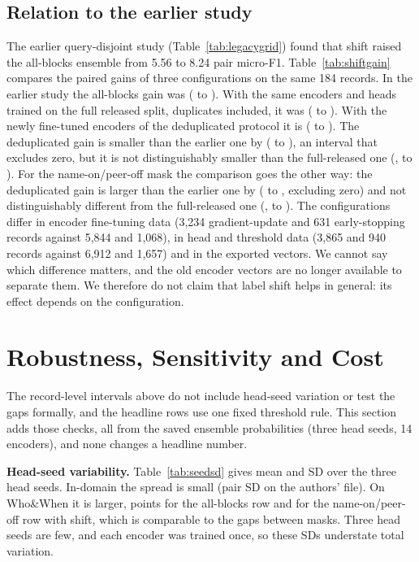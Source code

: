 \documentclass[conference]{IEEEtran}
\begin{document}
\subsection{Relation to the earlier study}
The earlier query-disjoint study (Table~\ref{tab:legacygrid}) found that shift raised the all-blocks ensemble from 5.56 to 8.24 pair micro-F1. Table~\ref{tab:shiftgain} compares the paired gains of three configurations on the same 184 records. In the earlier study the all-blocks gain was \sgOldOO{} (\sgOldOOLo{} to \sgOldOOHi{}). With the same encoders and heads trained on the full released split, duplicates included, it was \sgFullOO{} (\sgFullOOLo{} to \sgFullOOHi{}). With the newly fine-tuned encoders of the deduplicated protocol it is \sgDdOO{} (\sgDdOOLo{} to \sgDdOOHi{}). The deduplicated gain is smaller than the earlier one by \sdOldOO{} (\sdOldOOLo{} to \sdOldOOHi{}), an interval that excludes zero, but it is not distinguishably smaller than the full-released one (\sdFullOO{}, \sdFullOOLo{} to \sdFullOOHi{}). For the name-on/peer-off mask the comparison goes the other way: the deduplicated gain is larger than the earlier one by \sdOldOF{} (\sdOldOFLo{} to \sdOldOFHi{}, excluding zero) and not distinguishably different from the full-released one (\sdFullOF{}, \sdFullOFLo{} to \sdFullOFHi{}). The configurations differ in encoder fine-tuning data (3,234 gradient-update and 631 early-stopping records against 5,844 and 1,068), in head and threshold data (3,865 and 940 records against 6,912 and 1,657) and in the exported vectors. We cannot say which difference matters, and the old encoder vectors are no longer available to separate them. We therefore do not claim that label shift helps in general: its effect depends on the configuration.



\section{Robustness, Sensitivity and Cost}\label{sec:robust}
The record-level intervals above do not include head-seed variation or test the gaps formally, and the headline rows use one fixed threshold rule. This section adds those checks, all from the saved ensemble probabilities (three head seeds, 14 encoders), and none changes a headline number.

\textbf{Head-seed variability.} Table~\ref{tab:seedsd} gives mean and SD over the three head seeds. In-domain the spread is small (pair SD \sdAEpair{} on the authors' file). On Who\&When it is larger, \sdWWallPair{} points for the all-blocks row and \sdWWnameShiftPair{} for the name-on/peer-off row with shift, which is comparable to the gaps between masks. Three head seeds are few, and each encoder was trained once, so these SDs understate total variation.
\end{document}
